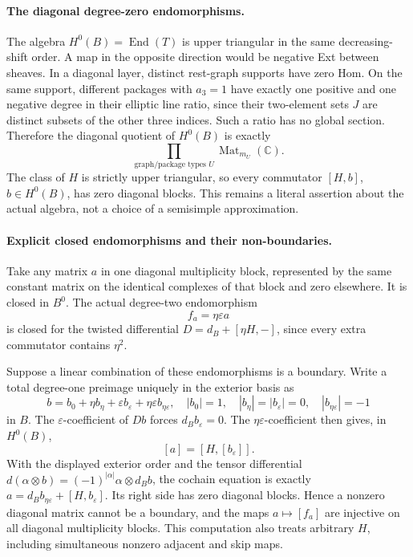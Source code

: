 \paragraph{The diagonal degree-zero endomorphisms.}
The algebra \(H^0(B)=\operatorname{End}(T)\) is upper triangular
in the same decreasing-shift order. A map in the opposite direction
would be negative Ext between sheaves. In a diagonal layer, distinct
rest-graph supports have zero Hom. On the same support, different
packages with \(a_3=1\) have exactly one positive and one negative
degree in their elliptic line ratio, since their two-element sets
\(J\) are distinct subsets of the other three indices. Such a
ratio has no global section. Therefore the diagonal quotient of
\(H^0(B)\) is exactly
\[
                 \prod_{\text{graph/package types }U}
                                      \operatorname{Mat}_{m_U}(\mathbb C).
\]
The class of \(H\) is strictly upper triangular, so every
commutator \([H,b]\), \(b\in H^0(B)\), has zero diagonal
blocks. This remains a literal assertion about the actual algebra,
not a choice of a semisimple approximation.

\paragraph{Explicit closed endomorphisms and their non-boundaries.}
Take any matrix \(a\) in one diagonal multiplicity block,
represented by the same constant matrix on the identical complexes
of that block and zero elsewhere. It is closed in \(B^0\).
The actual degree-two endomorphism
\[
                         f_a=\eta\varepsilon a
\]
is closed for the twisted differential
\(D=d_B+[\eta H,-]\), since every extra commutator contains
\(\eta^2\).

Suppose a linear combination of these endomorphisms is a boundary.
Write a total degree-one preimage uniquely in the exterior basis as
\[
 b=b_0+\eta b_\eta+\varepsilon b_\varepsilon
                  +\eta\varepsilon b_{\eta\varepsilon},
 \quad
 |b_0|=1,\quad |b_\eta|=|b_\varepsilon|=0,\quad
 |b_{\eta\varepsilon}|=-1
\]
in \(B\). The \(\varepsilon\)-coefficient of \(Db\) forces
\(d_Bb_\varepsilon=0\). The
\(\eta\varepsilon\)-coefficient then gives, in \(H^0(B)\),
\begin{equation}\label{eq:G24-diagonal-boundary}
                            [a]=[H,[b_\varepsilon]].
\end{equation}
With the displayed exterior order and the tensor differential
\(d(\alpha\otimes b)=(-1)^{|\alpha|}\alpha\otimes d_Bb\),
the cochain equation is exactly
\(a=d_Bb_{\eta\varepsilon}+[H,b_\varepsilon]\).
Its right side has zero
diagonal blocks. Hence a nonzero diagonal matrix cannot be a
boundary, and the maps \(a\mapsto[f_a]\) are injective on all
diagonal multiplicity blocks. This computation also treats arbitrary
\(H\), including simultaneous nonzero adjacent and skip maps.

